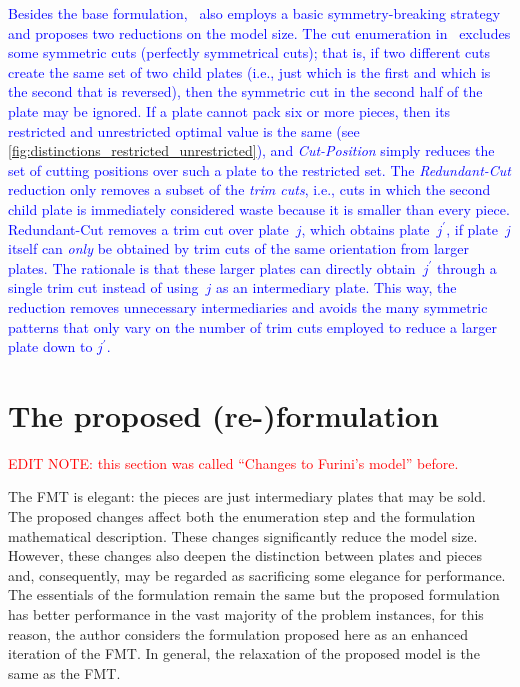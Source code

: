 \documentclass[ppgc,tese,english,formais,babel]{iiufrgs}
\newif\iffinalversion
\newcommand{\newtext}[1]{\iffinalversion%
#1%
\else%
\textcolor{blue}{#1}%
\fi%
}
\newcommand{\oldtext}[1]{\iffinalversion%
\else%
\textcolor{red}{#1}%
\fi%
}
\begin{document}
\newtext{
Besides the base formulation, \citet{furini:2016}~also employs a basic symmetry-breaking strategy and proposes two reductions on the model size.
The cut enumeration in~\citet{furini:2016} excludes some symmetric cuts (perfectly symmetrical cuts); that is, if two different cuts create the same set of two child plates (i.e., just which is the first and which is the second that is reversed), then the symmetric cut in the second half of the plate may be ignored.
If a plate cannot pack six or more pieces, then its restricted and unrestricted optimal value is the same (see \cref{fig:distinctions_restricted_unrestricted}), and \emph{Cut-Position} simply reduces the set of cutting positions over such a plate to the restricted set.
The \emph{Redundant-Cut} reduction only removes a subset of the \emph{trim cuts}, i.e., cuts in which the second child plate is immediately considered waste because it is smaller than every piece.
Redundant-Cut removes a trim cut over plate~\(j\), which obtains plate~\(j^\prime\), if plate~\(j\) itself can \emph{only} be obtained by trim cuts of the same orientation from larger plates.
The rationale is that these larger plates can directly obtain~\(j^\prime\) through a single trim cut instead of using~\(j\) as an intermediary plate.
This way, the reduction removes unnecessary intermediaries and avoids the many symmetric patterns that only vary on the number of trim cuts employed to reduce a larger plate down to \(j^\prime\).
}

\section{The proposed (re-)formulation}
\label{sec:enhanced_model}

\oldtext{EDIT NOTE: this section was called ``Changes to Furini's model'' before.}

The FMT is elegant: the pieces are just intermediary plates that may be sold.
The proposed changes affect both the enumeration step and the formulation mathematical description.
These changes significantly reduce the model size.
However, these changes also deepen the distinction between plates and pieces and, consequently, may be regarded as sacrificing some elegance for performance.
The essentials of the formulation remain the same but the proposed formulation has better performance in the vast majority of the problem instances, for this reason, the author considers the formulation proposed here as an enhanced iteration of the FMT.
In general, the relaxation of the proposed model is the same as the FMT.
\end{document}
